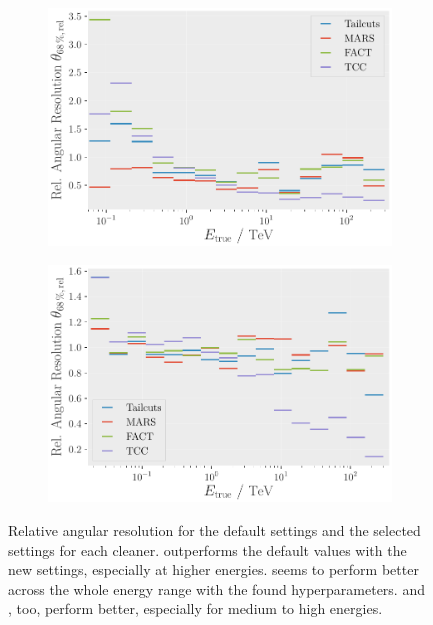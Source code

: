 \begin{figure}
    \centering
    \begin{subfigure}[t]{0.45\textwidth}
        \centering
        \includegraphics[width=\textwidth]{plots/ar_aeff/Rel_AR_0.10_0.15_base.pdf}
    \end{subfigure}
    \hfill
    \begin{subfigure}[t]{0.45\textwidth}
        \centering
        \includegraphics[width=\textwidth]{plots/ar_aeff/Rel_AR_0.40_0.45_base.pdf}
    \end{subfigure}
    \caption{Relative angular resolution for the default settings and the selected settings for each cleaner.
    \tcc{} outperforms the default values with the new settings, especially at higher energies. \mars{} seems
    to perform better across the whole energy range with the found hyperparameters. \fact{} and \tailcuts{}, too, perform
    better, especially for medium to high energies.}%
    \label{fig:rel_angres}
\end{figure}

